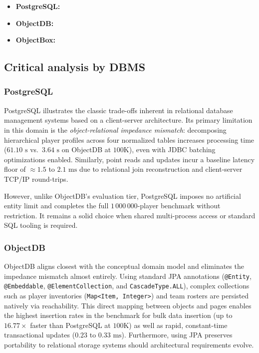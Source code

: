 \documentclass{article}
\begin{document}
\begin{itemize}
    \item \textbf{PostgreSQL:}

    \item \textbf{ObjectDB:}

    \item \textbf{ObjectBox:}
\end{itemize}

\subsection{Critical analysis by DBMS}

\subsubsection{PostgreSQL}
PostgreSQL illustrates the classic trade-offs inherent in relational database management systems based on a client-server architecture. Its primary limitation in this domain is the \emph{object-relational impedance mismatch}: decomposing hierarchical player profiles across four normalized tables increases processing time ($61.10\text{ s}$ vs.\ $3.64\text{ s}$ on ObjectDB at $100\text{K}$), even with JDBC batching optimizations enabled. Similarly, point reads and updates incur a baseline latency floor of $\approx 1.5$ to $2.1\text{ ms}$ due to relational join reconstruction and client-server TCP/IP round-trips.

However, unlike ObjectDB's evaluation tier, PostgreSQL imposes no artificial entity limit and completes the full $1\,000\,000$-player benchmark without restriction. It remains a solid choice when shared multi-process access or standard SQL tooling is required.

\subsubsection{ObjectDB}
ObjectDB aligns closest with the conceptual domain model and eliminates the impedance mismatch almost entirely. Using standard JPA annotations (\texttt{@Entity}, \texttt{@Embeddable}, \texttt{@ElementCollection}, and \texttt{Cascade\-Type.ALL}), complex collections such as player inventories (\texttt{Map<Item, Integer>}) and team rosters are persisted natively via reachability. This direct mapping between objects and pages enables the highest insertion rates in the benchmark for bulk data insertion (up to $16.77\times$ faster than PostgreSQL at $100\text{K}$) as well as rapid, constant-time transactional updates ($0.23$ to $0.33\text{ ms}$). Furthermore, using JPA preserves portability to relational storage systems should architectural requirements evolve.
\end{document}
